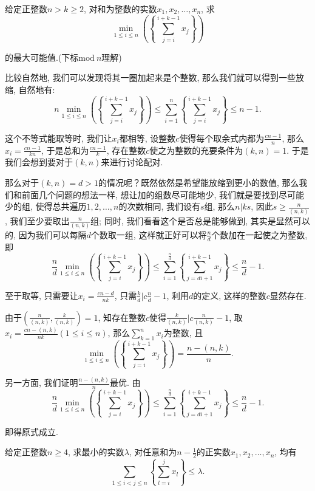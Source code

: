\documentclass[lang=cn,12pt,thmcnt=section]{elegantbook}
\begin{document}
\begin{example}
给定正整数$n>k\ge 2$, 对和为整数的实数$x_1,x_2,\dots{},x_n$, 求
\[
\min_{1\le i\le n}\left(\left\{\sum_{j=i}^{i+k-1}x_j\right\}\right)
\]

的最大可能值.(下标$\mathrm{mod}\ n$理解)
\end{example}

\begin{analysis}
比较自然地, 我们可以发现将其一圈加起来是个整数, 那么我们就可以得到一些放缩, 自然地有: 
\[
n\min_{1\le i\le n}\left(\left\{\sum_{j=i}^{i+k-1}x_j\right\}\right)\le \sum_{i=1}^n \left\{\sum_{j=i}^{i+k-1}x_j\right\}\le n-1.
\]

这个不等式能取等时, 我们让$x_i$都相等, 设整数$c$使得每个取余式内都为$\frac{cn-1}{n}$, 那么$x_i=\frac{cn-1}{kn}$, 于是总和为$\frac{cn-1}{k}$, 存在整数$c$使之为整数的充要条件为$(k,n)=1$. 于是我们会想到要对于$(k,n)$来进行讨论配对. 

那么对于$(k,n)=d>1$的情况呢？既然依然是希望能放缩到更小的数值, 那么我们和前面几个问题的想法一样, 想让加的组数尽可能地少, 我们就是要找到尽可能少的组, 使得总共遍历$1,2,\dots{},n$的次数相同, 我们设有$s$组, 那么$n|ks$, 因此$s\ge \frac{n}{(n,k)}$, 我们至少要取出$\frac{n}{(n,k)}$组; 同时, 我们看看这个是否总是能够做到, 其实是显然可以的, 因为我们可以每隔$d$个数取一组, 这样就正好可以将$\frac{n}{d}$个数加在一起使之为整数, 即
\[
\frac{n}{d}\min_{1\le i\le n}\left(\left\{\sum_{j=i}^{i+k-1}x_j\right\}\right)\le \sum_{i=1}^\frac{n}{d} \left\{\sum_{j=di+1}^{i+k-1}x_j\right\}\le \frac{n}{d}-1.
\]

至于取等, 只需要让$x_i=\frac{cn-d}{nk}$, 只需$\frac{k}{d}|c\frac{n}{d}-1$, 利用$d$的定义, 这样的整数$c$显然存在. 
\end{analysis}

\begin{solution}
由于$(\frac{n}{(n,k)},\frac{k}{(n,k)})=1$, 知存在整数$c$使得$\frac{k}{(n,k)}|c\frac{n}{(n,k)}-1$, 取$x_i=\frac{cn-(n,k)}{nk}(1\le i\le n)$, 那么$\sum_{k=1}^n x_i$为整数, 且
\[
\min_{1\le i\le n}\left(\left\{\sum_{j=i}^{i+k-1}x_j\right\}\right)=\frac{n-(n,k)}{n}.
\]

另一方面, 我们证明$\frac{n-(n,k)}{n}$最优. 由
\[
\frac{n}{d}\min_{1\le i\le n}\left(\left\{\sum_{j=i}^{i+k-1}x_j\right\}\right)\le \sum_{i=1}^\frac{n}{d} \left\{\sum_{j=di+1}^{i+k-1}x_j\right\}\le \frac{n}{d}-1.
\]

即得原式成立.
\end{solution}

\exercisetitle

\begin{exercise}
给定正整数$n\ge 4$, 求最小的实数$\lambda$, 对任意和为$n-\frac{1}{2}$的正实数$x_1,x_2,\dots{},x_n$, 均有
\[
\sum_{1\le i<j\le n}\left\{\sum_{l=i}^j x_l\right\}\le \lambda.
\]
\end{exercise}
\end{document}
